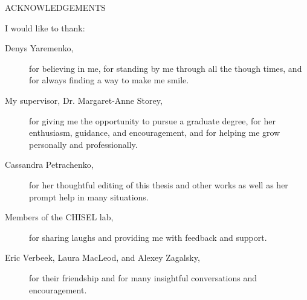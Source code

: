 \newpage
{}

\begin{center}
ACKNOWLEDGEMENTS
\end{center}

\noindent I would like to thank:
\begin{description}
\item[Denys Yaremenko,]
	for believing in me, for standing by me through all the though times, and for always finding a way to make me smile.
\item[My supervisor, Dr. Margaret-Anne Storey,]
	for giving me the opportunity to pursue a graduate degree, for her enthusiasm, guidance, and encouragement, and for helping me grow personally and professionally.
\item[Cassandra Petrachenko,]
	for her thoughtful editing of this thesis and other works as well as her prompt help in many situations.
\item[Members of the CHISEL lab,]
	for sharing laughs and providing me with feedback and support. 
\item[Eric Verbeek, Laura MacLeod, and Alexey Zagalsky,] 
	for their friendship and for many insightful conversations and encouragement.
	
\end{description}


